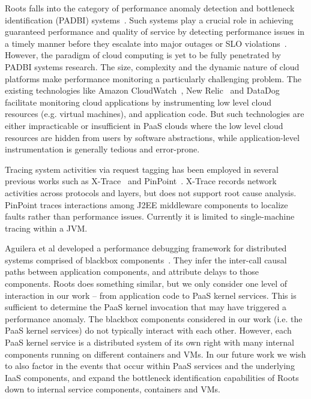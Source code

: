Roots falls into the category of performance anomaly detection and bottleneck identification 
(PADBI) systems~\cite{Ibidunmoye:2015:PAD:2808687.2791120}. 
Such systems play a crucial role in achieving guaranteed performance and
quality of service by detecting performance issues in a timely manner before they escalate into major outages
or SLO violations~\cite{6045942}. 
However, the paradigm of cloud computing is yet to be
fully penetrated by PADBI systems research. The size, complexity and the dynamic nature of 
cloud platforms make performance monitoring a particularly challenging problem.
The existing technologies like Amazon CloudWatch~\cite{cloudwatch},
New Relic~\cite{newrelic} and DataDog~\cite{datadog} facilitate monitoring cloud applications 
by instrumenting low level cloud resources (e.g. virtual machines), and application code. But such technologies
are either impracticable or insufficient in
PaaS clouds where the low level cloud resources are hidden from users by software abstractions, while
application-level instrumentation is generally tedious and error-prone.

Tracing system activities via request tagging has been employed in several
previous works such as X-Trace~\cite{Fonseca:2007:XPN:1973430.1973450} and 
PinPoint~\cite{Chen:2002:PPD:647883.738238}.
X-Trace records network activities across protocols and layers, but
does not support root cause analysis. PinPoint traces
interactions among J2EE middleware components to localize faults rather than performance
issues. Currently it is limited to single-machine tracing within a JVM.

Aguilera et al developed a performance debugging framework for distributed systems comprised of
blackbox components~\cite{Aguilera:2003:PDD:945445.945454}. 
They infer the inter-call causal paths between application components, and attribute delays to those
components. Roots does something similar, but we only consider one level of
interaction in our work -- from application code to PaaS kernel services. This is sufficient
to determine the PaaS kernel invocation that may have triggered a performance anomaly.
The blackbox components considered in our work (i.e. the PaaS kernel services) do not
typically interact with each other. However, each PaaS kernel service is a distributed system
of its own right with many internal components running on different containers and VMs.
In our future work we wish to also factor in the events that occur within PaaS services
and the underlying IaaS components, 
and expand the bottleneck identification capabilities of Roots down to internal
service components, containers and VMs.

